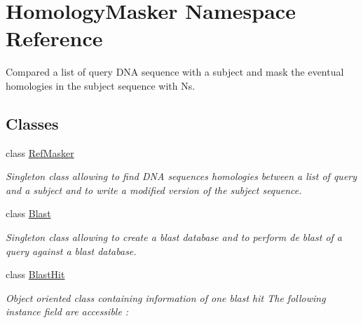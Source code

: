 \hypertarget{namespaceHomologyMasker}{\section{Homology\-Masker Namespace Reference}
\label{namespaceHomologyMasker}
}


Compared a list of query D\-N\-A sequence with a subject and mask the eventual homologies in the subject sequence with Ns.  


\subsection*{Classes}
\begin{DoxyCompactItemize}
\item 
class \hyperlink{classHomologyMasker_1_1RefMasker}{Ref\-Masker}
\begin{DoxyCompactList}\small\item\em Singleton class allowing to find D\-N\-A sequences homologies between a list of query and a subject and to write a modified version of the subject sequence. \end{DoxyCompactList}\item 
class \hyperlink{classHomologyMasker_1_1Blast}{Blast}
\begin{DoxyCompactList}\small\item\em Singleton class allowing to create a blast database and to perform de blast of a query against a blast database. \end{DoxyCompactList}\item 
class \hyperlink{classHomologyMasker_1_1BlastHit}{Blast\-Hit}
\begin{DoxyCompactList}\small\item\em Object oriented class containing information of one blast hit The following instance field are accessible \-: \end{DoxyCompactList}\end{DoxyCompactItemize}
